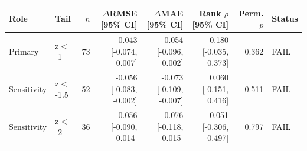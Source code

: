 \begin{tabular}{llrrrrrl}
\toprule
Role & Tail & $n$ & $\Delta$RMSE [95\% CI] & $\Delta$MAE [95\% CI] & Rank $\rho$ [95\% CI] & Perm. $p$ & Status \\
\midrule
Primary & z$<$-1 & 73 & -0.043 [-0.074, 0.007] & -0.054 [-0.096, 0.002] & 0.180 [-0.035, 0.373] & 0.362 & FAIL \\
Sensitivity & z$<$-1.5 & 52 & -0.056 [-0.083, -0.002] & -0.073 [-0.109, -0.007] & 0.060 [-0.151, 0.416] & 0.511 & FAIL \\
Sensitivity & z$<$-2 & 36 & -0.056 [-0.090, 0.014] & -0.076 [-0.118, 0.015] & -0.051 [-0.306, 0.497] & 0.797 & FAIL \\
\bottomrule
\end{tabular}
